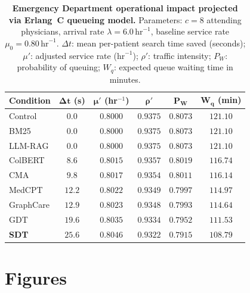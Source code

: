 \documentclass[12pt]{article}
\begin{document}
\begin{table}[t!]
  \centering
  \caption{\textbf{Emergency Department operational impact projected via Erlang~C queueing model.} Parameters: $c=8$ attending physicians, arrival rate $\lambda=6.0\,\text{hr}^{-1}$, baseline service rate $\mu_0=0.80\,\text{hr}^{-1}$. $\Delta t$: mean per-patient search time saved (seconds); $\mu'$: adjusted service rate ($\text{hr}^{-1}$); $\rho'$: traffic intensity; $P_W$: probability of queuing; $W_q$: expected queue waiting time in minutes.}
  \label{tab:queueing_results}
  \small
  \begin{tabular}{@{}lccccc@{}}
    \toprule
    \textbf{Condition} & $\mathbf{\Delta t}$ \textbf{(s)} & $\mathbf{\mu'}$ \textbf{(hr}$^{-1}$\textbf{)} & $\mathbf{\rho'}$ & $\mathbf{P_W}$ & $\mathbf{W_q}$ \textbf{(min)} \\
    \midrule
    Control   & $0.0$  & $0.8000$ & $0.9375$ & $0.8073$ & $121.10$ \\
    BM25      & $0.0$  & $0.8000$ & $0.9375$ & $0.8073$ & $121.10$ \\
    LLM-RAG   & $0.0$  & $0.8000$ & $0.9375$ & $0.8073$ & $121.10$ \\
    ColBERT   & $8.6$  & $0.8015$ & $0.9357$ & $0.8019$ & $116.74$ \\
    CMA       & $9.8$  & $0.8017$ & $0.9354$ & $0.8011$ & $116.14$ \\
    MedCPT    & $12.2$ & $0.8022$ & $0.9349$ & $0.7997$ & $114.97$ \\
    GraphCare & $12.9$ & $0.8023$ & $0.9348$ & $0.7993$ & $114.64$ \\
    GDT       & $19.6$ & $0.8035$ & $0.9334$ & $0.7952$ & $111.53$ \\
    \midrule
    \textbf{SDT} & $\mathbf{25.6}$ & $\mathbf{0.8046}$ & $\mathbf{0.9322}$ & $\mathbf{0.7915}$ & $\mathbf{108.79}$ \\
    \bottomrule
  \end{tabular}
\end{table}

\newpage

\section*{Figures}
\end{document}
